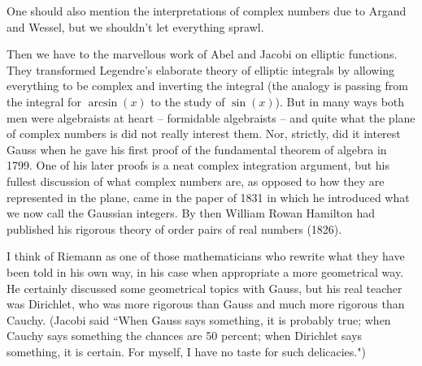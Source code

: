 \documentclass[11pt]{book}
\begin{document}
One should also mention the interpretations of complex numbers due to Argand and Wessel, but we shouldn't let everything sprawl. 


Then we have to the marvellous work of Abel and Jacobi on elliptic functions. They transformed Legendre's elaborate theory of elliptic integrals by allowing everything to be complex and inverting the integral (the analogy is passing from the integral for $\arcsin (x)$ to the study of $\sin (x)$). But in many ways both men were algebraists at heart -- formidable algebraists -- and quite what the plane of complex numbers is did not really interest them. Nor, strictly, did it interest Gauss when he gave his first proof of the fundamental theorem of algebra in 1799. One of his later proofs is a neat complex integration argument, but his fullest discussion of what complex numbers are, as opposed to how they are represented in the plane, came in the paper of 1831 in which he introduced what we now call the Gaussian integers. By then William Rowan Hamilton had published his rigorous theory of order pairs of real numbers (1826).


I think of Riemann as one of those mathematicians who rewrite what they have been told in his own way, in his case when appropriate a more geometrical way. He certainly discussed some geometrical topics with Gauss, but his real teacher was Dirichlet, who was more rigorous than Gauss and much more rigorous than Cauchy. (Jacobi said ``When Gauss says something, it is probably true; when Cauchy says something the chances are 50 percent; when Dirichlet says something, it is certain. For myself, I have no taste for such delicacies.") 
\end{document}
